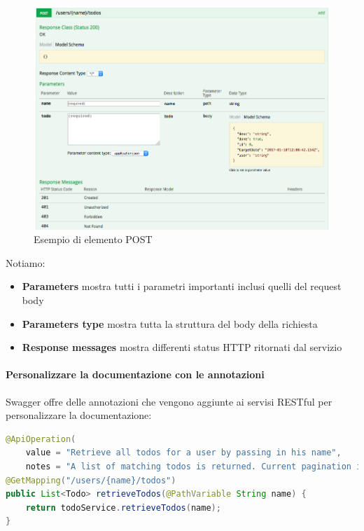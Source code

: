 \documentclass[11pt,a4paper]{book}
\begin{document}
\begin{figure}[h!]
	\begin{center}
		\includegraphics[scale=0.6]{img/005.png}
		\caption{Esempio di elemento POST}
		\label{fig: 005}
	\end{center}
\end{figure}

Notiamo:
\begin{itemize}
	\item \textbf{Parameters} mostra tutti i parametri importanti inclusi quelli del request body
	\item \textbf{Parameters type} mostra tutta la struttura del body della richiesta
	\item \textbf{Response messages} mostra differenti status HTTP ritornati dal servizio
\end{itemize}

\paragraph{Personalizzare la documentazione con le annotazioni}
Swagger offre delle annotazioni che vengono aggiunte ai servisi RESTful per personalizzare la documentazione:
\begin{lstlisting}[language = Java]
@ApiOperation(
	value = "Retrieve all todos for a user by passing in his name",
	notes = "A list of matching todos is returned. Current pagination is not supported." response = Todo.class, responseContainer = "List" produces = "application/json")
@GetMapping("/users/{name}/todos")
public List<Todo> retrieveTodos(@PathVariable String name) {
	return todoService.retrieveTodos(name);
}
\end{lstlisting}
\end{document}
